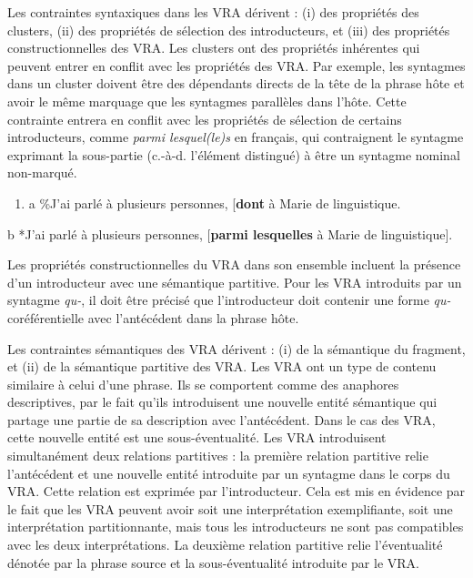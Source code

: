 Les contraintes syntaxiques dans les VRA dérivent : (i) des propriétés des clusters, (ii) des propriétés de sélection des introducteurs, et (iii) des propriétés constructionnelles des VRA. Les clusters ont des propriétés inhérentes qui peuvent entrer en conflit avec les propriétés des VRA. Par exemple, les syntagmes dans un cluster doivent être des dépendants directs de la tête de la phrase hôte et avoir le même marquage que les syntagmes parallèles dans l'hôte. Cette contrainte entrera en conflit avec les propriétés de sélection de certains introducteurs, comme \textit{parmi lesquel(le)s} en français, qui contraignent le syntagme exprimant la sous-partie (c.-à-d. l'élément distingué) à être un syntagme nominal non-marqué.


\begin{enumerate}
\item a  \%J'ai parlé à plusieurs personnes, [\textbf{dont} à Marie de linguistique. 


\end{enumerate}
  b  *J'ai parlé à plusieurs personnes, [\textbf{parmi lesquelles} à Marie de linguistique].

Les propriétés constructionnelles du VRA dans son ensemble incluent la présence d'un introducteur avec une sémantique partitive. Pour les VRA introduits par un syntagme \textit{qu-}, il doit être précisé que l'introducteur doit contenir une forme \textit{qu-} coréférentielle avec l'antécédent dans la phrase hôte.

Les contraintes sémantiques des VRA dérivent : (i) de la sémantique du fragment, et (ii) de la sémantique partitive des VRA. Les VRA ont un type de contenu similaire à celui d'une phrase. Ils se comportent comme des anaphores descriptives, par le fait qu'ils introduisent une nouvelle entité sémantique qui partage une partie de sa description avec l'antécédent. Dans le cas des VRA, cette nouvelle entité est une sous-éventualité. Les VRA introduisent simultanément deux relations partitives : la première relation partitive relie l'antécédent et une nouvelle entité introduite par un syntagme dans le corps du VRA. Cette relation est exprimée par l'introducteur. Cela est mis en évidence par le fait que les VRA peuvent avoir soit une interprétation exemplifiante, soit une interprétation partitionnante, mais tous les introducteurs ne sont pas compatibles avec les deux interprétations. La deuxième relation partitive relie l'éventualité dénotée par la phrase source et la sous-éventualité introduite par le VRA.

